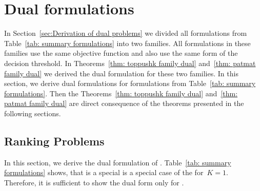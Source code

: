 \section{Dual formulations}

In Section~\ref{sec:Derivation of dual problems} we divided all formulations from Table~\ref{tab: summary formulations} into two families. All formulations in these families use the same objective function and also use the same form of the decision threshold. In Theorems~\ref{thm: toppushk family dual} and~\ref{thm: patmat family dual} we derived the dual formulation for these two families. In this section, we derive dual formulations for formulations from Table~\ref{tab: summary formulations}. Then the Theorems~\ref{thm: toppushk family dual} and~\ref{thm: patmat family dual} are direct consequence of the theorems presented in the following sections. 

\subsection{Ranking Problems}

In this section, we derive the dual formulation of \TopPushK. Table~\ref{tab: summary formulations} shows, that \TopPush is a special is a special case of the \TopPushK for~$K = 1.$ Therefore, it is sufficient to show the dual form only for \TopPushK.

